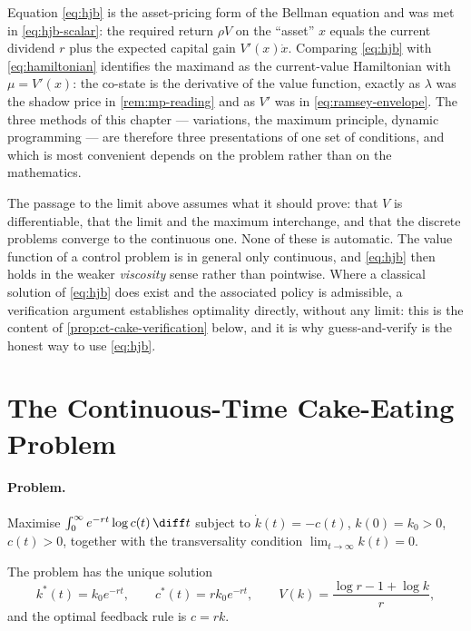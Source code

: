 Equation \eqref{eq:hjb} is the asset-pricing form of the Bellman equation and was
met in \eqref{eq:hjb-scalar}: the required return $\rho V$ on the ``asset'' $x$
equals the current dividend $r$ plus the expected capital gain
$V'(x)\dot x$. Comparing \eqref{eq:hjb} with \eqref{eq:hamiltonian} identifies
the maximand as the current-value Hamiltonian with $\mu=V'(x)$: the co-state is
the derivative of the value function, exactly as $\lambda$ was the shadow price in
\autoref{rem:mp-reading} and as $V'$ was in \eqref{eq:ramsey-envelope}. The three
methods of this chapter --- variations, the maximum principle, dynamic programming
--- are therefore three presentations of one set of conditions, and which is most
convenient depends on the problem rather than on the mathematics.

\begin{remark}\label{rem:hjb-heuristic}
	The passage to the limit above assumes what it should prove: that $V$ is
	differentiable, that the limit and the maximum interchange, and that the
	discrete problems converge to the continuous one. None of these is automatic.
	The value function of a control problem is in general only continuous, and
	\eqref{eq:hjb} then holds in the weaker \emph{viscosity} sense rather than
	pointwise. Where a classical solution of \eqref{eq:hjb} does exist and the
	associated policy is admissible, a verification argument establishes optimality
	directly, without any limit: this is the content of
	\autoref{prop:ct-cake-verification} below, and it is why guess-and-verify is the
	honest way to use \eqref{eq:hjb}.
\end{remark}

\section{The Continuous-Time Cake-Eating Problem}\label{sec:ct-cake}

\paragraph{Problem.} Maximise $\int_0^{\infty}e^{-rt}\log c(t)\,\diff t$ subject to
$\dot k(t)=-c(t)$, $k(0)=k_0>0$, $c(t)>0$, together with the transversality
condition $\lim_{t\to\infty}k(t)=0$.

\begin{proposition}\label{prop:ct-cake}
	The problem has the unique solution
	\begin{equation}\label{eq:ct-cake-solution}
		k^{\ast}(t)=k_0e^{-rt},
		\qquad
		c^{\ast}(t)=rk_0e^{-rt},
		\qquad
		V(k)=\frac{\log r-1+\log k}{r},
	\end{equation}
	and the optimal feedback rule is $c=rk$.
\end{proposition}


